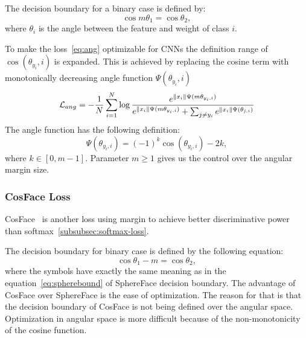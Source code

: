 The decision boundary for a binary case is defined by:
\begin{equation}
    \label{eq:spherebound}
    \cos{m\theta_1} = \cos{\theta_2},
\end{equation}
where $\theta_i$ is the angle between the feature and weight of class $i$.

To make the loss~\ref{eq:ang} optimizable for CNNs the definition range of $\cos(\theta_{y_i},i)$ is expanded.
This is achieved by replacing the cosine term with monotonically decreasing angle function $\Psi(\theta_{y_i},i)$
\begin{equation}
    \mathcal{L}_{ang} = -\frac{1}{N} \sum_{i=1}^{N} \log \frac{e^{\left\lVert x_i\right\rVert \Psi(m\theta_{y_i,i})}}
    {e^{\left\lVert x_i\right\rVert \Psi(m\theta_{y_i,i})} + \sum_{j \neq y_i} e^{\left\lVert x_{i}\right\rVert \Psi(\theta_{j,i})}}
\end{equation}
The angle function has the following definition:
\begin{equation}
    \Psi(\theta_{y_i,i}) = (-1)^{k} \cos(\theta_{y_{i},i}) -2k,
\end{equation}
where $k \in \left[ 0, m-1 \right]$.
Parameter $m \geq 1$ gives us the control over the angular margin size.

\subsubsection{CosFace Loss}\label{subsubsec:cosface}
CosFace~\cite{CosFace} is another loss using margin to achieve better discriminative power than
softmax~\ref{subsubsec:softmax-loss}.

The decision boundary for binary case is defined by the following equation:
\begin{equation}
    \label{eq:cosbounary}
    \cos{\theta_1} - m = \cos{\theta_2},
\end{equation}
where the symbols have exactly the same meaning as in the equation~\ref{eq:spherebound} of SphereFace decision boundary.
The advantage of CosFace over SphereFace is the ease of optimization.
The reason for that is that the decision boundary of CosFace is not being defined over the angular space.
Optimization in angular space is more difficult because of the non-monotonicity of the cosine function.

